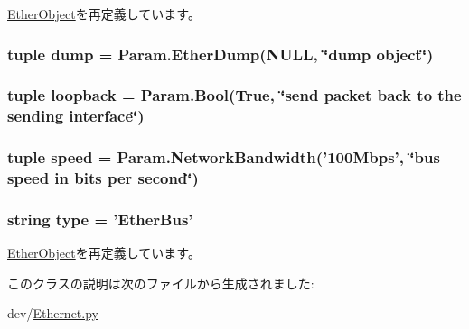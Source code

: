 \hyperlink{classEthernet_1_1EtherObject_a17da7064bc5c518791f0c891eff05fda}{EtherObject}を再定義しています。\hypertarget{classEthernet_1_1EtherBus_aef8d0e67d5fcd75abc7d08ee1952b0de}{
\subsubsection[{dump}]{\setlength{\rightskip}{0pt plus 5cm}tuple {\bf dump} = Param.EtherDump(NULL, \char`\"{}dump object\char`\"{})}}
\label{classEthernet_1_1EtherBus_aef8d0e67d5fcd75abc7d08ee1952b0de}
\hypertarget{classEthernet_1_1EtherBus_aef61658bdfb1270125b24a27b1b38492}{
\subsubsection[{loopback}]{\setlength{\rightskip}{0pt plus 5cm}tuple {\bf loopback} = Param.Bool(True, \char`\"{}send packet back to the sending interface\char`\"{})}}
\label{classEthernet_1_1EtherBus_aef61658bdfb1270125b24a27b1b38492}
\hypertarget{classEthernet_1_1EtherBus_a33da1950995c2bf1208262efeb4de233}{
\subsubsection[{speed}]{\setlength{\rightskip}{0pt plus 5cm}tuple {\bf speed} = Param.NetworkBandwidth('100Mbps', \char`\"{}bus speed in bits per second\char`\"{})}}
\label{classEthernet_1_1EtherBus_a33da1950995c2bf1208262efeb4de233}
\hypertarget{classEthernet_1_1EtherBus_acce15679d830831b0bbe8ebc2a60b2ca}{
\subsubsection[{type}]{\setlength{\rightskip}{0pt plus 5cm}string {\bf type} = '{\bf EtherBus}'}}
\label{classEthernet_1_1EtherBus_acce15679d830831b0bbe8ebc2a60b2ca}


\hyperlink{classEthernet_1_1EtherObject_acce15679d830831b0bbe8ebc2a60b2ca}{EtherObject}を再定義しています。

このクラスの説明は次のファイルから生成されました:\begin{DoxyCompactItemize}
\item 
dev/\hyperlink{Ethernet_8py}{Ethernet.py}\end{DoxyCompactItemize}
